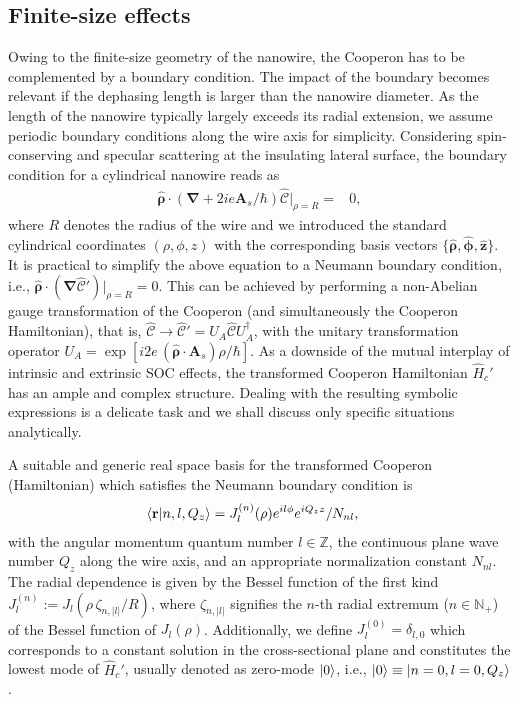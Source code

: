 \documentclass[superscriptaddress,noshowpacs,noshowkeys, twocolumn, floatfix,aps, prb,reprint]{revtex4-1}
\begin{document}
\subsection{Finite-size effects}\label{sec:finite-size}
%
Owing to the finite-size geometry of the nanowire, the Cooperon has to be complemented by a boundary condition.
The impact of the boundary becomes relevant if the dephasing length is larger than the nanowire diameter.
As the length of the nanowire typically largely exceeds its radial extension, we assume periodic boundary conditions along the wire axis for simplicity.
Considering spin-conserving and specular scattering at the insulating lateral surface, the boundary condition for a cylindrical nanowire reads as\cite{AltshulerAronov1981,Aleiner2001,Meyer2002,Kettemann2007a}
%
\begin{align}
\boldsymbol{\hat{\rho}}\cdot\left(\boldsymbol{\nabla}+2i e  \mathbf{A}_s/\hbar\right)\hat{\mathcal{C}}\vert_{\rho=R}={}&0,
\label{eq:boundary}
\end{align}
%
where $R$ denotes the radius of the wire and we introduced the standard cylindrical coordinates $(\rho,\phi,z)$ with the corresponding basis vectors $\{\boldsymbol{\hat{\rho}},\boldsymbol{\hat{\phi}},\boldsymbol{\hat{z}} \}$.
It is practical to simplify the above equation to a Neumann boundary condition, i.e., $\boldsymbol{\hat{\rho}}\cdot(\boldsymbol{\nabla}\hat{\mathcal{C}}')\vert_{\rho=R}=0$. 
This can be achieved by performing a non-Abelian gauge transformation of the Cooperon (and simultaneously the Cooperon Hamiltonian), that is, $\hat{\mathcal{C}}\rightarrow\hat{\mathcal{C}}'=U_A\hat{\mathcal{C}}U_A^\dag$, with the unitary transformation operator $U_A=\exp[i 2 e\,(\boldsymbol{\hat{\rho}} \cdot\mathbf{A}_s)\rho/\hbar ]$.
As a downside of the mutual interplay of intrinsic and extrinsic SOC effects, the transformed Cooperon Hamiltonian $\hat{H}_c'$ has an ample and complex structure.
Dealing with the resulting symbolic expressions is a delicate task and we  shall discuss only specific situations analytically.

A suitable and generic real space basis for the transformed Cooperon (Hamiltonian) which satisfies the Neumann boundary condition is
%
\begin{align}
\braket{\mathbf{r}|n,l,Q_z}={}&J_l^{(n)}(\rho)e^{il\phi}e^{iQ_z z}/N_{nl},
\label{eq:basis}
\end{align}
%
with the angular momentum quantum number $l\in \mathbb{Z}$, the continuous plane wave number $Q_z$ along the wire axis, and an appropriate normalization constant $N_{nl}$.
The radial dependence is given by the Bessel function of the first kind $J_l^{(n)}:=J_l(\rho\,\zeta_{n,\vert l\vert}/R)$, where $\zeta_{n,\vert l\vert}$ signifies the $n$-th radial extremum ($n\in \mathbb{N}_+$) of the Bessel function of $J_l(\rho)$. 
Additionally, we  define $J_l^{(0)}=\delta_{l,0}$ which corresponds to a constant solution in the cross-sectional plane  and constitutes the lowest mode of $\hat{H}_c'$, usually denoted as zero-mode $\ket{0}$, i.e., $\ket{0}\equiv \ket{n=0,l=0,Q_z}$.
\end{document}
